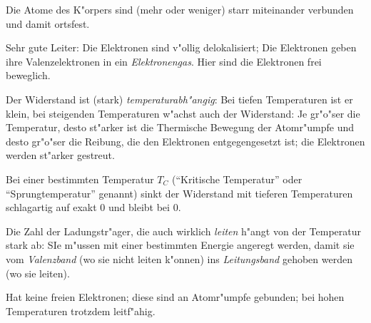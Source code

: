 \begin{description}[\setlabelstyle{\bfseries\slshape}]
\item[Festk"orper] Die Atome des K"orpers sind (mehr oder weniger) starr
   miteinander verbunden und damit ortsfest.
   \begin{description}[\setlabelstyle{\bfseries\slshape}]
   \item[Reine Metalle] Sehr gute Leiter: Die Elektronen sind v"ollig
      delokalisiert; Die Elektronen geben ihre Valenzelektronen in ein
      \emph{Elektronengas}. Hier sind die Elektronen frei beweglich.

      Der Widerstand ist (stark) \emph{temperaturabh"angig}: Bei tiefen
      Temperaturen ist er klein, bei steigenden Temperaturen w"achst
      auch der Widerstand: Je gr"o"ser die Temperatur, desto st"arker ist
      die Thermische Bewegung der Atomr"umpfe und desto gr"o"ser die
      Reibung, die den Elektronen entgegengesetzt ist; die Elektronen
      werden st"arker gestreut.
   \item[Supraleiter] Bei einer bestimmten Temperatur $T_C$
      ("`Kritische Temperatur"' oder
      "`Sprungtemperatur"' genannt) sinkt
      der Widerstand mit tieferen Temperaturen schlagartig auf exakt
      $0$ und bleibt bei $0$.
   \item[Halbleiter] Die Zahl der Ladungstr"ager, die auch wirklich
      \emph{leiten} h"angt von der Temperatur stark ab: SIe m"ussen mit
      einer bestimmten Energie angeregt werden, damit sie vom
      \emph{Valenzband} (wo sie nicht leiten k"onnen)
      ins \emph{Leitungsband} gehoben werden (wo
      sie leiten).
   \item[Isolator] Hat keine freien Elektronen; diese sind an
      Atomr"umpfe gebunden; bei hohen Temperaturen trotzdem leitf"ahig.


\end{description}
\end{description}
